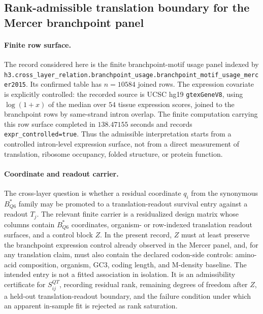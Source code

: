 \subsection{Rank-admissible translation boundary for the Mercer branchpoint panel}\label{sec:bioreality-branchpoint-motif-usage-mercer2015-rank-admissible-translation-boundary}

\paragraph{Finite row surface.}
The record considered here is the finite branchpoint-motif usage panel indexed by \texttt{h3.cross\_layer\_relation.branchpoint\_usage.branchpoint\_motif\_usage\_mercer2015}. Its confirmed table has $n=10584$ joined rows. The expression covariate is explicitly controlled: the recorded source is UCSC hg19 \texttt{gtexGeneV8}, using $\log(1+x)$ of the median over $54$ tissue expression scores, joined to the branchpoint rows by same-strand intron overlap. The finite computation carrying this row surface completed in $138.47155$ seconds and records \texttt{expr\_controlled=true}. Thus the admissible interpretation starts from a controlled intron-level expression surface, not from a direct measurement of translation, ribosome occupancy, folded structure, or protein function.

\paragraph{Coordinate and readout carrier.}
The cross-layer question is whether a residual coordinate $q_i$ from the synonymous $B^*_{Q6}$ family may be promoted to a translation-readout survival entry against a readout $T_j$. The relevant finite carrier is a residualized design matrix whose columns contain $B^*_{Q6}$ coordinates, organism- or row-indexed translation readout surfaces, and a control block $Z$. In the present record, $Z$ must at least preserve the branchpoint expression control already observed in the Mercer panel, and, for any translation claim, must also contain the declared codon-side controls: amino-acid composition, organism, GC3, coding length, and M-density baseline. The intended entry is not a fitted association in isolation. It is an admissibility certificate for $S^{QT}_{ij}$, recording residual rank, remaining degrees of freedom after $Z$, a held-out translation-readout boundary, and the failure condition under which an apparent in-sample fit is rejected as rank saturation.


